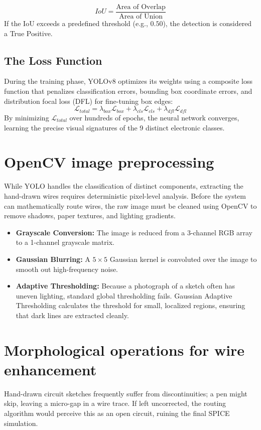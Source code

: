 \begin{equation}
    IoU = \frac{\text{Area of Overlap}}{\text{Area of Union}}
\end{equation}
If the IoU exceeds a predefined threshold (e.g., $0.50$), the detection is considered a True Positive.

\subsection{The Loss Function}
During the training phase, YOLOv8 optimizes its weights using a composite loss function that penalizes classification errors, bounding box coordinate errors, and distribution focal loss (DFL) for fine-tuning box edges:
\begin{equation}
    \mathcal{L}_{total} = \lambda_{box} \mathcal{L}_{box} + \lambda_{cls} \mathcal{L}_{cls} + \lambda_{dfl} \mathcal{L}_{dfl}
\end{equation}
By minimizing $\mathcal{L}_{total}$ over hundreds of epochs, the neural network converges, learning the precise visual signatures of the 9 distinct electronic classes.

\section{OpenCV image preprocessing}
While YOLO handles the classification of distinct components, extracting the hand-drawn wires requires deterministic pixel-level analysis. Before the system can mathematically route wires, the raw image must be cleaned using OpenCV to remove shadows, paper textures, and lighting gradients.

\begin{itemize}
    \item \textbf{Grayscale Conversion:} The image is reduced from a 3-channel RGB array to a 1-channel grayscale matrix.
    \item \textbf{Gaussian Blurring:} A $5 \times 5$ Gaussian kernel is convoluted over the image to smooth out high-frequency noise.
    \item \textbf{Adaptive Thresholding:} Because a photograph of a sketch often has uneven lighting, standard global thresholding fails. Gaussian Adaptive Thresholding calculates the threshold for small, localized regions, ensuring that dark lines are extracted cleanly.
\end{itemize}

\section{Morphological operations for wire enhancement}
Hand-drawn circuit sketches frequently suffer from discontinuities; a pen might skip, leaving a micro-gap in a wire trace. If left uncorrected, the routing algorithm would perceive this as an open circuit, ruining the final SPICE simulation.

